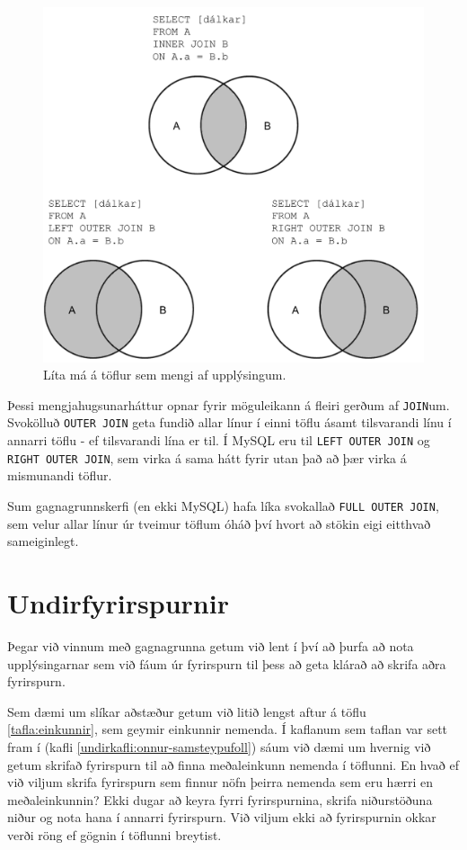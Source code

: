 \begin{figure}
\caption[Mengi]{Líta má á töflur sem mengi af upplýsingum.}
\label{mynd:join-mengi}
\centering
\includegraphics[width=\linewidth]{myndir/join-mengi}
\end{figure}

Þessi mengjahugsunarháttur opnar fyrir möguleikann á fleiri gerðum af \verb|JOIN|um. Svokölluð \verb|OUTER JOIN| geta fundið allar línur í einni töflu ásamt tilsvarandi línu í annarri töflu - ef tilsvarandi lína er til. Í MySQL eru til \verb|LEFT OUTER JOIN| og \verb|RIGHT OUTER JOIN|, sem virka á sama hátt fyrir utan það að þær virka á mismunandi töflur.

Sum gagnagrunnskerfi (en ekki MySQL) hafa líka svokallað \verb|FULL OUTER JOIN|, sem velur allar línur úr tveimur töflum óháð því hvort að stökin eigi eitthvað sameiginlegt.

\section{Undirfyrirspurnir}
\label{undirkafli:undirfyrirspurnir}
Þegar við vinnum með gagnagrunna getum við lent í því að þurfa að nota upplýsingarnar sem við fáum úr fyrirspurn til þess að geta klárað að skrifa aðra fyrirspurn.

Sem dæmi um slíkar aðstæður getum við litið lengst aftur á töflu \ref{tafla:einkunnir}, sem geymir einkunnir nemenda. Í kaflanum sem taflan var sett fram í (kafli \ref{undirkafli:onnur-samsteypufoll}) sáum við dæmi um hvernig við getum skrifað fyrirspurn til að finna meðaleinkunn nemenda í töflunni. En hvað ef við viljum skrifa fyrirspurn sem finnur nöfn þeirra nemenda sem eru hærri en meðaleinkunnin? Ekki dugar að keyra fyrri fyrirspurnina, skrifa niðurstöðuna niður og nota hana í annarri fyrirspurn. Við viljum ekki að fyrirspurnin okkar verði röng ef gögnin í töflunni breytist.


